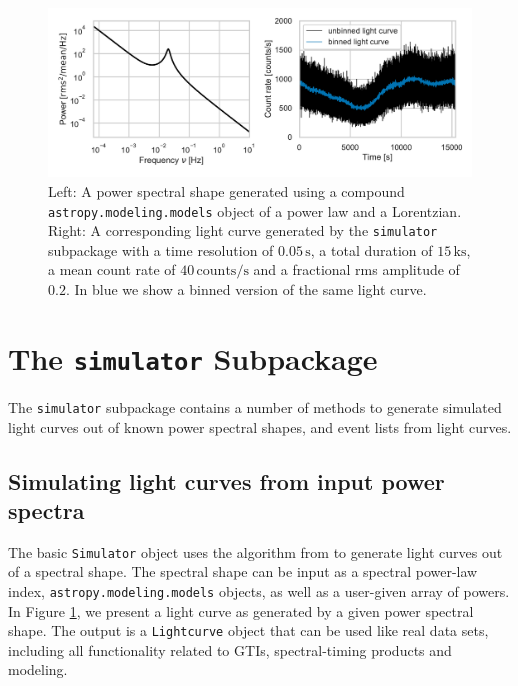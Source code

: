 \documentclass[twocolumn]{aastex62}
\begin{document}
\begin{figure}[htbp]
\begin{center}
\includegraphics[width=\linewidth]{../figures/sim_lc.pdf}
\caption{Left: A power spectral shape generated using a compound \texttt{astropy.modeling.models} object of a power law and a Lorentzian. 
Right: A corresponding light curve generated by the \texttt{simulator} subpackage with a time resolution of $0.05\,\mathrm{s}$, a total duration of $15\,\mathrm{ks}$, a mean count rate of $40\,\mathrm{counts}/\mathrm{s}$ and a fractional rms amplitude of $0.2$. In blue we show a binned version of the same light curve.}
\label{fig:sim_lc}
\end{center}
\end{figure}

\section{The \texttt{simulator} Subpackage}
\label{sec:simulator}

The \texttt{simulator} subpackage contains a number of methods to generate simulated light curves out of known power spectral shapes, and event lists from light curves. 

\subsection{Simulating light curves from input power spectra}
The basic \texttt{Simulator} object uses the algorithm from \citet{timmer1995} to generate light curves out of a spectral shape. 
The spectral shape can be input as a spectral power-law index, \texttt{astropy.modeling.models} objects, as well as a user-given array of powers.
In Figure \ref{fig:sim_lc}, we present a light curve as generated by a given power spectral shape. 
The output is a \texttt{Lightcurve} object that can be used like real data sets, including all functionality related to GTIs, spectral-timing products and modeling. 
\end{document}
